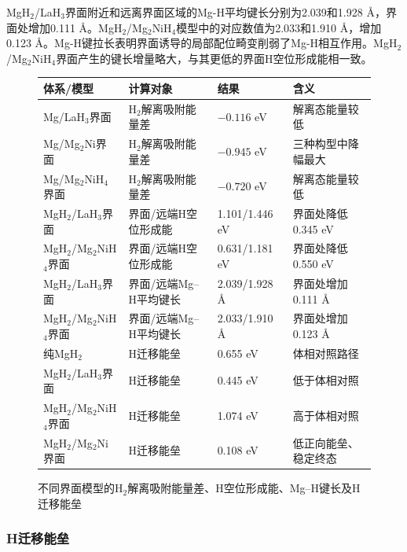 \documentclass[preprint,12pt]{elsarticle}
\begin{document}
MgH$_{\mathrm{2}}$/LaH$_{\mathrm{3}}$界面附近和远离界面区域的Mg-H平均键长分别为2.039和1.928 Å，界面处增加0.111 Å。MgH$_{\mathrm{2}}$/Mg$_{\mathrm{2}}$NiH$_{\mathrm{4}}$模型中的对应数值为2.033和1.910 Å，增加0.123 Å。Mg-H键拉长表明界面诱导的局部配位畸变削弱了Mg-H相互作用。MgH$_{\mathrm{2}}$/Mg$_{\mathrm{2}}$NiH$_{\mathrm{4}}$界面产生的键长增量略大，与其更低的界面H空位形成能相一致。

\begin{figure}[htbp]
\makeatletter{}\makeatother
\centering
\caption{不同界面模型的H$_2$解离吸附能量差、H空位形成能、Mg--H键长及H迁移能垒}
\label{tab:6}
\begingroup
\fontsize{9.5}{12}\selectfont
\setlength{\tabcolsep}{4pt}
\renewcommand{\arraystretch}{1.1}
\begin{tabular*}{\textwidth}{@{\extracolsep{\fill}}llll@{}}
\toprule
体系/模型 & 计算对象 & 结果 & 含义 \\
\midrule
Mg/LaH$_3$界面 & H$_2$解离吸附能量差 & $-0.116$ eV & 解离态能量较低 \\
Mg/Mg$_2$Ni界面 & H$_2$解离吸附能量差 & $-0.945$ eV & 三种构型中降幅最大 \\
Mg/Mg$_2$NiH$_4$界面 & H$_2$解离吸附能量差 & $-0.720$ eV & 解离态能量较低 \\
MgH$_2$/LaH$_3$界面 & 界面/远端H空位形成能 & 1.101/1.446 eV & 界面处降低0.345 eV \\
MgH$_2$/Mg$_2$NiH$_4$界面 & 界面/远端H空位形成能 & 0.631/1.181 eV & 界面处降低0.550 eV \\
MgH$_2$/LaH$_3$界面 & 界面/远端Mg--H平均键长 & 2.039/1.928 Å & 界面处增加0.111 Å \\
MgH$_2$/Mg$_2$NiH$_4$界面 & 界面/远端Mg--H平均键长 & 2.033/1.910 Å & 界面处增加0.123 Å \\
纯MgH$_2$ & H迁移能垒 & 0.655 eV & 体相对照路径 \\
MgH$_2$/LaH$_3$界面 & H迁移能垒 & 0.445 eV & 低于体相对照 \\
MgH$_2$/Mg$_2$NiH$_4$界面 & H迁移能垒 & 1.074 eV & 高于体相对照 \\
MgH$_2$/Mg$_2$Ni界面 & H迁移能垒 & 0.108 eV & 低正向能垒、稳定终态  \\
\bottomrule
\end{tabular*}
\endgroup
\end{figure}

\subsubsection{H迁移能垒}
\end{document}
